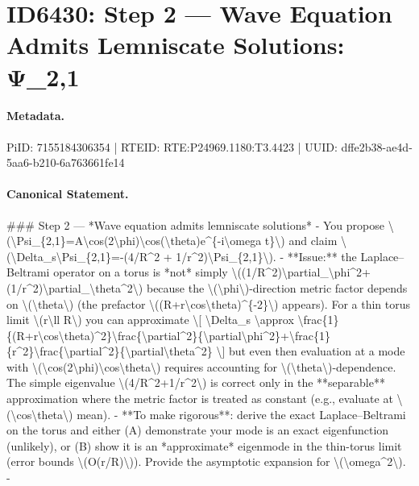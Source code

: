 \section*{ID6430: Step 2 — Wave Equation Admits Lemniscate Solutions: Ψ\_2,1}
\paragraph{Metadata.}
PiID: 7155184306354 | RTEID: RTE:P24969.1180:T3.4423 | UUID: dffe2b38-ae4d-5aa6-b210-6a763661fe14

\paragraph{Canonical Statement.}
\#\#\# Step 2 — *Wave equation admits lemniscate solutions* - You propose \textbackslash{}(\textbackslash{}Psi\_\{2,1\}=A\textbackslash{}cos(2\textbackslash{}phi)\textbackslash{}cos(\textbackslash{}theta)e\textasciicircum{}\{-i\textbackslash{}omega t\}\textbackslash{}) and claim \textbackslash{}(\textbackslash{}Delta\_s\textbackslash{}Psi\_\{2,1\}=-(4/R\textasciicircum{}2 + 1/r\textasciicircum{}2)\textbackslash{}Psi\_\{2,1\}\textbackslash{}). - **Issue:** the Laplace–Beltrami operator on a torus is *not* simply \textbackslash{}((1/R\textasciicircum{}2)\textbackslash{}partial\_\textbackslash{}phi\textasciicircum{}2+(1/r\textasciicircum{}2)\textbackslash{}partial\_\textbackslash{}theta\textasciicircum{}2\textbackslash{}) because the \textbackslash{}(\textbackslash{}phi\textbackslash{})-direction metric factor depends on \textbackslash{}(\textbackslash{}theta\textbackslash{}) (the prefactor \textbackslash{}((R+r\textbackslash{}cos\textbackslash{}theta)\textasciicircum{}\{-2\}\textbackslash{}) appears). For a thin torus limit \textbackslash{}(r\textbackslash{}ll R\textbackslash{}) you can approximate \textbackslash{}[ \textbackslash{}Delta\_s \textbackslash{}approx \textbackslash{}frac\{1\}\{(R+r\textbackslash{}cos\textbackslash{}theta)\textasciicircum{}2\}\textbackslash{}frac\{\textbackslash{}partial\textasciicircum{}2\}\{\textbackslash{}partial\textbackslash{}phi\textasciicircum{}2\}+\textbackslash{}frac\{1\}\{r\textasciicircum{}2\}\textbackslash{}frac\{\textbackslash{}partial\textasciicircum{}2\}\{\textbackslash{}partial\textbackslash{}theta\textasciicircum{}2\} \textbackslash{}] but even then evaluation at a mode with \textbackslash{}(\textbackslash{}cos(2\textbackslash{}phi)\textbackslash{}cos\textbackslash{}theta\textbackslash{}) requires accounting for \textbackslash{}(\textbackslash{}theta\textbackslash{})-dependence. The simple eigenvalue \textbackslash{}(4/R\textasciicircum{}2+1/r\textasciicircum{}2\textbackslash{}) is correct only in the **separable** approximation where the metric factor is treated as constant (e.g., evaluate at \textbackslash{}(\textbackslash{}cos\textbackslash{}theta\textbackslash{}) mean). - **To make rigorous**: derive the exact Laplace–Beltrami on the torus and either (A) demonstrate your mode is an exact eigenfunction (unlikely), or (B) show it is an *approximate* eigenmode in the thin-torus limit (error bounds \textbackslash{}(O(r/R)\textbackslash{})). Provide the asymptotic expansion for \textbackslash{}(\textbackslash{}omega\textasciicircum{}2\textbackslash{}). - 